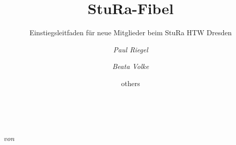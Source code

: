\documentclass[english,11pt,paper=a4,DIV=calc]{scrartcl}
\title{StuRa-Fibel}
\subtitle{Einstiegsleitfaden für neue Mitglieder beim StuRa HTW Dresden}
\author{
	\emph{Paul Riegel}
	\and
	\emph{Beata Volke}
	\and
	others
}
\date{}%
\begin{document}
\begin{titlepage}
	\centering
	\hspace{1cm}\\
	\vfill

	\begin{figure}[htbp]
		\centering
		\begin{scaletikzpicturetowidth}{\textwidth}%
			\sturalogo{}%
		\end{scaletikzpicturetowidth}
	\end{figure}
	\vspace{3cm}

	{\scshape\Huge \thetitle \par}
	\vfill

	\emph{von\\%
		\vspace{1em}
		\theauthor
	}

	\newpage

\end{titlepage}


\tableofcontents


\end{document}
